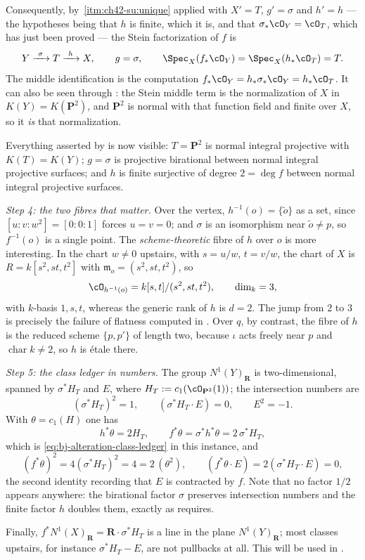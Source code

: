 \begin{example}
Consequently, by \,\cref{itm:ch42-su:unique}
applied with $X'=T$, $g'=\sigma$ and $h'=h$ --- the hypotheses being
that $h$ is finite, which it is, and that
$\sigma_*\cO_Y=\cO_T$, which has just been proved --- the Stein
factorization of $f$ is
\[
 Y\xrightarrow{\ \sigma\ }T\xrightarrow{\ h\ }X,
 \qquad
 g=\sigma,\qquad
 \Spec_X(f_*\cO_Y)=\Spec_X(h_*\cO_T)=T .
\]
The middle identification is the computation
$f_*\cO_Y=h_*\sigma_*\cO_Y=h_*\cO_T$.
It can also be seen through
: the Stein middle term is the
normalization of $X$ in $K(Y)=K(\mathbf P^2)$, and $\mathbf P^2$ is
normal with that function field and finite over $X$, so it \emph{is} that
normalization.

Everything asserted by  is now visible:
$T=\mathbf P^2$ is normal integral projective with $K(T)=K(Y)$;
$g=\sigma$ is projective birational between normal integral projective
surfaces; and $h$ is finite surjective of degree $2=\deg f$ between
normal integral projective surfaces.

\emph{Step 4: the two fibres that matter.}
Over the vertex, $h^{-1}(o)=\{\tilde o\}$ as a set, since
$[u:v:w^2]=[0:0:1]$ forces $u=v=0$; and $\sigma$ is an isomorphism near
$\tilde o\ne p$, so $f^{-1}(o)$ is a single point.  The
\emph{scheme-theoretic} fibre of $h$ over $o$ is more interesting.  In
the chart $w\ne0$ upstairs, with $s=u/w$, $t=v/w$, the chart of $X$
is $R=k[s^2,st,t^2]$ with $\mathfrak m_o=(s^2,st,t^2)$, so
\[
 \cO_{h^{-1}(o)}=k[s,t]/(s^2,st,t^2),
 \qquad
 \dim_k=3,
\]
with $k$-basis $1,s,t$, whereas the generic rank of $h$ is
$d=2$.  The jump from $2$ to $3$ is precisely the failure of flatness
computed in .  Over $q$, by contrast, the fibre
of $h$ is the reduced scheme $\{p,p'\}$ of length two, because $\iota$
acts freely near $p$ and $\operatorname{char}k\ne2$, so $h$ is étale
there.

\emph{Step 5: the class ledger in numbers.}
The group $N^1(Y)_{\mathbf R}$ is two-dimensional, spanned by
$\sigma^*H_T$ and $E$, where $H_T:=c_1(\cO_{\mathbf P^2}(1))$; the
intersection numbers are
\[
 (\sigma^*H_T)^2=1,\qquad (\sigma^*H_T\cdot E)=0,\qquad E^2=-1 .
\]
With $\theta=c_1(H)$ one has
\[
 h^*\theta=2H_T,
 \qquad
 f^*\theta=\sigma^*h^*\theta=2\,\sigma^*H_T,
\]
which is \eqref{eq:bj-alteration-class-ledger} in this instance, and
\[
 (f^*\theta)^2=4(\sigma^*H_T)^2=4=2\,(\theta^2),
 \qquad
 (f^*\theta\cdot E)=2(\sigma^*H_T\cdot E)=0,
\]
the second identity recording that $E$ is contracted by $f$.  Note that
no factor $1/2$ appears anywhere: the birational factor $\sigma$
preserves intersection numbers and the finite factor $h$ doubles them,
exactly as  requires.

Finally, $f^*N^1(X)_{\mathbf R}=\mathbf R\cdot\sigma^*H_T$ is a line in the
plane $N^1(Y)_{\mathbf R}$; most classes upstairs, for instance
$\sigma^*H_T-E$, are not pullbacks at all.  This will be used in
.
\end{example}

